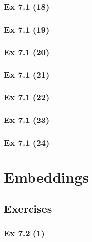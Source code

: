 \subsubsection{Ex 7.1 (18)}\label{sec:Ex_7.1.18}

\subsubsection{Ex 7.1 (19)}\label{sec:Ex_7.1.19}

\subsubsection{Ex 7.1 (20)}\label{sec:Ex_7.1.20}

\newpage		%

\subsubsection{Ex 7.1 (21)}\label{sec:Ex_7.1.21}

\subsubsection{Ex 7.1 (22)}\label{sec:Ex_7.1.22}

\subsubsection{Ex 7.1 (23)}\label{sec:Ex_7.1.23}

\subsubsection{Ex 7.1 (24)}\label{sec:Ex_7.1.24}

\newpage		%

\section{Embeddings}\label{sec:7.2}
\subsection{Exercises}\label{sec:7.2_Exercises}

\subsubsection{Ex 7.2 (1)}\label{sec:Ex_7.2.1}

